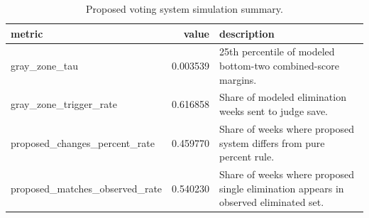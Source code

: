 \begin{table}
\caption{Proposed voting system simulation summary.}
\begin{tabular}{lrl}
\toprule
metric & value & description \\
\midrule
gray\_zone\_tau & 0.003539 & 25th percentile of modeled bottom-two combined-score margins. \\
gray\_zone\_trigger\_rate & 0.616858 & Share of modeled elimination weeks sent to judge save. \\
proposed\_changes\_percent\_rate & 0.459770 & Share of weeks where proposed system differs from pure percent rule. \\
proposed\_matches\_observed\_rate & 0.540230 & Share of weeks where proposed single elimination appears in observed eliminated set. \\
\bottomrule
\end{tabular}
\end{table}
